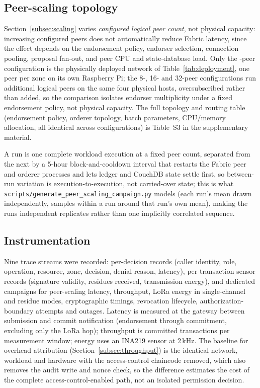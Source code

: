 \documentclass[a4paper,fleqn]{cas-dc}
\begin{document}
\subsection{Peer-scaling topology}
\label{subsec:topology}

Section~\ref{subsec:scaling} varies \emph{configured logical peer count},
not physical capacity: increasing configured peers does not automatically
reduce Fabric latency, since the effect depends on the endorsement policy,
endorser selection, connection pooling, proposal fan-out, and peer CPU and
state-database load. Only the \ScaleMinPeers-peer configuration is the
physically deployed network of Table~\ref{tab:deployment}, one peer per
zone on its own Raspberry Pi; the \num{8}-, \num{16}- and \num{32}-peer
configurations run additional logical peers on the same four physical
hosts, oversubscribed rather than added, so the comparison isolates
endorser multiplicity under a fixed endorsement policy, not physical
capacity. The full topology and routing table (endorsement policy,
orderer topology, batch parameters, CPU/memory allocation, all identical
across configurations) is Table~S3 in the supplementary material.

A run is one complete workload execution at a fixed peer count, separated
from the next by a 5-hour block-and-cooldown interval that restarts the
Fabric peer and orderer processes and lets ledger and CouchDB state
settle first, so between-run variation is execution-to-execution, not
carried-over state; this is what
\texttt{scripts/generate\_peer\_scaling\_campaign.py} models (each run's
mean drawn independently, samples within a run around that run's own
mean), making the runs independent replicates rather than one implicitly
correlated sequence.

\subsection{Instrumentation}
\label{subsec:instrumentation}

Nine trace streams were recorded: per-decision records (caller identity,
role, operation, resource, zone, decision, denial reason, latency),
per-transaction sensor records (signature validity, residues received,
transmission energy), and dedicated campaigns for peer-scaling latency,
throughput, LoRa energy in single-channel and residue modes,
cryptographic timings, revocation lifecycle, authorization-boundary
attempts and outages. Latency is measured at the gateway between
submission and commit notification (endorsement through commitment,
excluding only the LoRa hop); throughput is committed transactions per
measurement window; energy uses an INA219 sensor at 2\,kHz. The baseline
for overhead attribution (Section~\ref{subsec:throughput}) is the
identical network, workload and hardware with the access-control
chaincode removed, which also removes the audit write and nonce check, so
the difference estimates the cost of the complete access-control-enabled
path, not an isolated permission decision.
\end{document}

